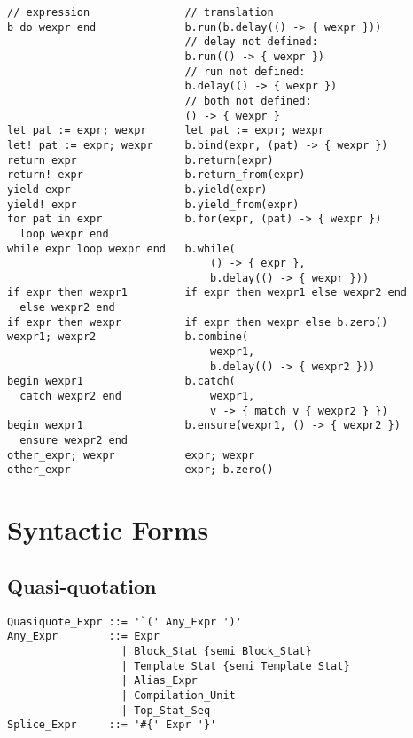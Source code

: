 \begin{lstlisting}[emph={expr,wexpr,wexpr1,wexpr2,b,pat},emphstyle=\color{RubineRed}]
// expression               // translation
b do wexpr end              b.run(b.delay(() -> { wexpr }))
                            // delay not defined:
                            b.run(() -> { wexpr })
                            // run not defined:
                            b.delay(() -> { wexpr })
                            // both not defined:
                            () -> { wexpr }
let pat := expr; wexpr      let pat := expr; wexpr
let! pat := expr; wexpr     b.bind(expr, (pat) -> { wexpr })
return expr                 b.return(expr)
return! expr                b.return_from(expr)
yield expr                  b.yield(expr)
yield! expr                 b.yield_from(expr)
for pat in expr             b.for(expr, (pat) -> { wexpr })
  loop wexpr end 
while expr loop wexpr end   b.while(
                                () -> { expr }, 
                                b.delay(() -> { wexpr }))
if expr then wexpr1         if expr then wexpr1 else wexpr2 end
  else wexpr2 end
if expr then wexpr          if expr then wexpr else b.zero()
wexpr1; wexpr2              b.combine(
                                wexpr1, 
                                b.delay(() -> { wexpr2 }))
begin wexpr1                b.catch(
  catch wexpr2 end              wexpr1, 
                                v -> { match v { wexpr2 } })
begin wexpr1                b.ensure(wexpr1, () -> { wexpr2 })
  ensure wexpr2 end
other_expr; wexpr           expr; wexpr
other_expr                  expr; b.zero()
\end{lstlisting}





\section{Syntactic Forms}
\label{sec:syntactic-forms}

\subsection{Quasi-quotation}
\label{sec:quasi-quotation}

\syntax\begin{lstlisting}
Quasiquote_Expr ::= '`(' Any_Expr ')'
Any_Expr        ::= Expr
                  | Block_Stat {semi Block_Stat}
                  | Template_Stat {semi Template_Stat}
                  | Alias_Expr
                  | Compilation_Unit
                  | Top_Stat_Seq
Splice_Expr     ::= '#{' Expr '}'
\end{lstlisting}

